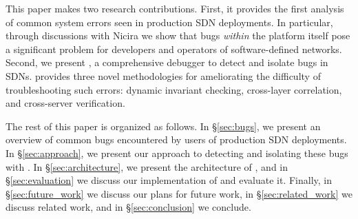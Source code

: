 %
%
%
%

This paper makes two research contributions. First, it provides the first
analysis of common system errors seen in production SDN deployments. In
particular, through discussions with Nicira we show that bugs {\it within} the platform
itself pose a significant problem for developers and operators of software-defined
networks. Second, we present \projectname{}, a comprehensive debugger to detect and isolate bugs in SDNs.
\projectname{} provides three novel methodologies for ameliorating the difficulty of
troubleshooting such errors: dynamic invariant checking, cross-layer
correlation, and cross-server verification.

The rest of this paper is organized as follows. In \S\ref{sec:bugs}, we present an overview of common bugs encountered by users of production SDN deployments. In \S\ref{sec:approach}, we present our approach to detecting and isolating these bugs with \projectname{}. In \S\ref{sec:architecture}, we present the architecture of \projectname{}, and in \S\ref{sec:evaluation} we discuss our implementation of \projectname{} and evaluate it. Finally, in \S\ref{sec:future_work} we discuss our plans for future work, in \S\ref{sec:related_work} we discuss related work, and in \S\ref{sec:conclusion} we conclude.
